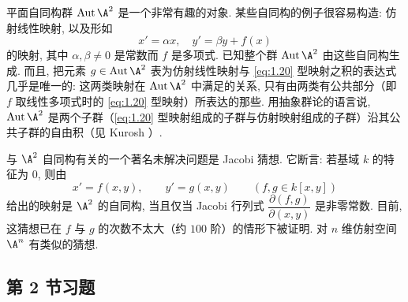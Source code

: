 平面自同构群 $\operatorname{Aut} \A^2$ 是一个非常有趣的对象. 某些自同构的例子很容易构造: 仿射线性映射, 以及形如
\begin{equation}
	\label{eq:1.20}
	x' = \alpha x, \quad y' = \beta y + f(x)
\end{equation}
的映射, 其中 $\alpha, \beta \ne 0$ 是常数而 $f$ 是多项式. 已知整个群 $\operatorname{Aut} \A^2$ 由这些自同构生成. 而且, 把元素 $g \in \operatorname{Aut} \A^2$ 表为仿射线性映射与 \eqref{eq:1.20} 型映射之积的表达式几乎是唯一的: 这两类映射在 $\operatorname{Aut} \A^2$ 中满足的关系, 只有由两类有公共部分（即 $f$ 取线性多项式时的 \eqref{eq:1.20} 型映射）所表达的那些. 用抽象群论的语言说, $\operatorname{Aut} \A^2$ 是两个子群（\eqref{eq:1.20} 型映射组成的子群与仿射映射组成的子群）沿其公共子群的自由积（见 Kurosh \cite[第 IX 章第 35 节及例 10]{kurosh1960}）.

与 $\A^2$ 自同构有关的一个著名未解决问题是 Jacobi 猜想. 它断言: 若基域 $k$ 的特征为 $0$, 则由
\[
	x' = f(x, y), \qquad y' = g(x, y) \qquad (f, g \in k[x,y])
\]
给出的映射是 $\A^2$ 的自同构, 当且仅当 Jacobi 行列式 $\dfrac{\partial(f, g)}{\partial(x, y)}$ 是非零常数. 目前, 这猜想已在 $f$ 与 $g$ 的次数不太大（约 $100$ 阶）的情形下被证明. 对 $n$ 维仿射空间 $\A^n$ 有类似的猜想.

\subsection{第 2 节习题}

